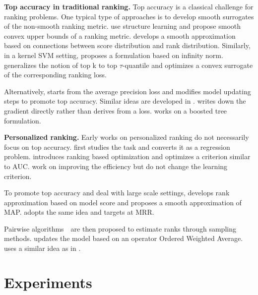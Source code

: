 \documentclass[letterpaper]{article} %
\begin{document}
\textbf{Top accuracy in traditional ranking.} Top accuracy is a classical challenge for ranking problems. %
One typical type of approaches is to develop smooth surrogates of the non-smooth ranking metric.\cite{weimer2008cofi} use structure learning and propose smooth convex upper bounds of a ranking metric. \cite{taylor2008softrank} develops a smooth approximation based on connections between score distribution and rank distribution. Similarly, in a kernel SVM setting, \cite{agarwal2011infinite} proposes a formulation based on infinity norm. \cite{boyd2012accuracy} generalizes the notion of top k to top $\tau$-quantile and optimizes a convex surrogate of the corresponding ranking loss.

Alternatively, \cite{burges2005learning} starts from the average precision loss and modifies model updating steps to promote top accuracy. Similar ideas are developed in \cite{burges2007learning,wu2010adapting}. \cite{burges2007learning} writes down the gradient directly rather than derives from a loss. \cite{wu2010adapting} works on a boosted tree formulation.

\noindent\textbf{Personalized ranking.} Early works on personalized ranking do not necessarily focus on top accuracy. \cite{hu2008collaborative} first studies the task and converts it as a regression problem. \cite{rendle2009bpr} introduces ranking based optimization and optimizes a criterion similar to AUC. \cite{rendle2014improving} work on improving the efficiency but do not change the learning criterion.

To promote top accuracy and deal with large scale settings, \cite{shi2012tfmap} develops rank approximation based on model score and proposes a smooth approximation of MAP. \cite{shi2012climf} adopts the same idea and targets at MRR. 

Pairwise algorithms~\cite{weston2010large,yuan2016lambdafm}~are then proposed to estimate ranks through sampling methods. \cite{weston2010large} updates the model based on an operator Ordered Weighted Average. \cite{yuan2016lambdafm} uses a similar idea as in \cite{burges2005learning}.

\section{Experiments}
\label{sec:exp}
\end{document}

